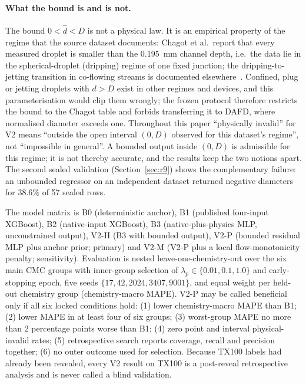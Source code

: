 \documentclass[11pt,a4paper]{article}
\newcommand{\tox}{TX100}
\begin{document}
\paragraph{What the bound is and is not.} The bound $0<\hat d<D$ is not a
physical law. It is an empirical property of the regime that the source
dataset documents: Chagot et al.\ report that every measured droplet is
smaller than the 0.195~mm channel depth, i.e.\ the data lie in the
spherical-droplet (dripping) regime of one fixed junction; the
dripping-to-jetting transition in co-flowing streams is documented
elsewhere~\cite{utada2007}. Confined, plug or
jetting droplets with $d>D$ exist in other regimes and devices, and this
parameterisation would clip them wrongly; the frozen protocol therefore
restricts the bound to the Chagot table and forbids transferring it to DAFD,
where normalised diameter exceeds one. Throughout this paper ``physically
invalid'' for V2 means ``outside the open interval $(0,D)$ observed for this
dataset's regime'', not ``impossible in general''. A bounded output inside
$(0,D)$ is admissible for this regime; it is not thereby accurate, and the
results keep the two notions apart. The second sealed validation
(Section~\ref{sec:r9}) shows the complementary failure: an unbounded
regressor on an independent dataset returned negative diameters for 38.6\% of 57 sealed rows.

The model matrix is B0 (deterministic anchor), B1 (published four-input
XGBoost), B2 (native-input XGBoost), B3 (native-plus-physics MLP, unconstrained
output), V2-H (B3 with bounded output), V2-P (bounded residual MLP plus anchor
prior; primary) and V2-M (V2-P plus a local flow-monotonicity penalty;
sensitivity). Evaluation is nested leave-one-chemistry-out over the six main
CMC groups with inner-group selection of $\lambda_p\in\{0.01,0.1,1.0\}$ and
early-stopping epoch, five seeds $\{17,42,2024,3407,9001\}$, and equal weight
per held-out chemistry group (chemistry-macro MAPE). V2-P may be called
beneficial only if all six locked conditions hold: (1) lower chemistry-macro
MAPE than B1; (2) lower MAPE in at least four of six groups; (3) worst-group
MAPE no more than 2 percentage points worse than B1; (4) zero point and
interval physical-invalid rates; (5) retrospective search reports coverage,
recall and precision together; (6) no outer outcome used for selection.
Because \tox{} labels had already been revealed, every V2 result on \tox{} is
a post-reveal retrospective analysis and is never called a blind validation.
\end{document}
